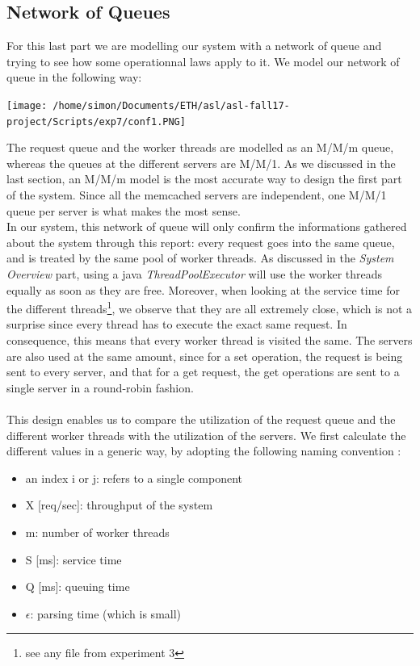 \documentclass[11pt,a4paper]{article}
\begin{document}
\subsection{Network of Queues}
For this last part we are modelling our system with a network of queue and trying to see how some operationnal laws apply to it. We model our network of queue in the following way:
\begin{center} 
\texttt{[image: /home/simon/Documents/ETH/asl/asl-fall17-project/Scripts/exp7/conf1.PNG]}
\end{center} 
The request queue and the worker threads are modelled as an M/M/m queue, whereas the queues at the different servers are M/M/1. As we discussed in the last section, an M/M/m model is the most accurate way to design the first part of the system. Since all the memcached servers are independent, one M/M/1 queue per server is what makes the most sense. 
\\
In our system, this network of queue will only confirm the informations gathered about the system through this report: every request goes into the same queue, and is treated by the same pool of worker threads. As discussed in the \textit{System Overview} part, using a java \textit{ThreadPoolExecutor} will use the worker threads equally as soon as they are free. Moreover, when looking at the service time for the different threads\footnote{see any file from experiment 3}, we observe that they are all extremely close, which is not a surprise since every thread has to execute the exact same request. In consequence, this means that every worker thread is visited the same. 
The servers are also used at the same amount, since for a set operation, the request is being sent to every server, and that for a get request, the get operations are sent to a single server in a round-robin fashion.    
\\\\
This design enables us to compare the utilization of the request queue and the different worker threads with the utilization of the servers. We first calculate the different values in a generic way, by adopting the following naming convention :
\begin{itemize}
\item an index i or j: refers to a single component
\item X [req/sec]: throughput of the system
\item m: number of worker threads
\item S [ms]: service time
\item Q [ms]: queuing time
\item \(\epsilon \): parsing time (which is small)
\end{itemize}  
\end{document}
